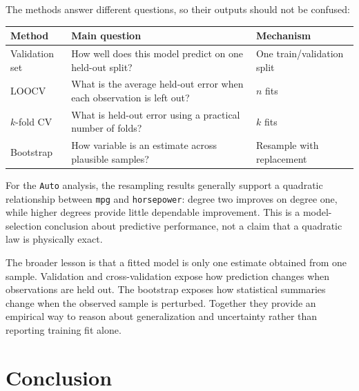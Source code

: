 \documentclass[
  11pt,
]{article}
\newcounter{none} %
\begin{document}
The methods answer different questions, so their outputs should not be
confused:

{\def\LTcaptype{none} %
\begin{longtable}[]{@{}
  >{\raggedright\arraybackslash}p{}
  >{\raggedright\arraybackslash}p{}
  >{\raggedright\arraybackslash}p{}@{}}
\toprule\noalign{}
\begin{minipage}[b]{\linewidth}\raggedright
Method
\end{minipage} & \begin{minipage}[b]{\linewidth}\raggedright
Main question
\end{minipage} & \begin{minipage}[b]{\linewidth}\raggedright
Mechanism
\end{minipage} \\
\midrule\noalign{}
\endhead
\bottomrule\noalign{}
\endlastfoot
Validation set & How well does this model predict on one held-out split?
& One train/validation split \\
LOOCV & What is the average held-out error when each observation is left
out? & \(n\) fits \\
\(k\)-fold CV & What is held-out error using a practical number of
folds? & \(k\) fits \\
Bootstrap & How variable is an estimate across plausible samples? &
Resample with replacement \\
\end{longtable}
}

For the \texttt{Auto} analysis, the resampling results generally support
a quadratic relationship between \texttt{mpg} and \texttt{horsepower}:
degree two improves on degree one, while higher degrees provide little
dependable improvement. This is a model-selection conclusion about
predictive performance, not a claim that a quadratic law is physically
exact.

The broader lesson is that a fitted model is only one estimate obtained
from one sample. Validation and cross-validation expose how prediction
changes when observations are held out. The bootstrap exposes how
statistical summaries change when the observed sample is perturbed.
Together they provide an empirical way to reason about generalization
and uncertainty rather than reporting training fit alone.

\section{Conclusion}\label{conclusion}
\end{document}
